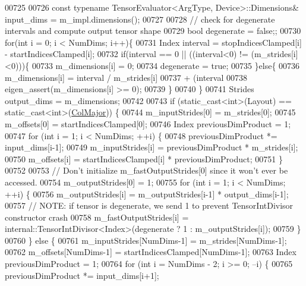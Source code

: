 \begin{DoxyCode}
00725 
00726     \textcolor{keyword}{const} \textcolor{keyword}{typename} TensorEvaluator<ArgType, Device>::Dimensions& input\_dims = m\_impl.dimensions();
00727 
00728     \textcolor{comment}{// check for degenerate intervals and compute output tensor shape}
00729     \textcolor{keywordtype}{bool} degenerate = \textcolor{keyword}{false};;
00730     \textcolor{keywordflow}{for}(\textcolor{keywordtype}{int} i = 0; i < NumDims; i++)\{
00731       Index interval = stopIndicesClamped[i] - startIndicesClamped[i];
00732       \textcolor{keywordflow}{if}(interval == 0 || ((interval<0) != (m\_strides[i]<0)))\{
00733         m\_dimensions[i] = 0;
00734         degenerate = \textcolor{keyword}{true};
00735       \}\textcolor{keywordflow}{else}\{
00736         m\_dimensions[i] = interval / m\_strides[i]
00737                           + (interval %
00738         eigen\_assert(m\_dimensions[i] >= 0);
00739       \}
00740     \}
00741     Strides output\_dims = m\_dimensions;
00742 
00743     \textcolor{keywordflow}{if} (static\_cast<int>(Layout) == static\_cast<int>(\hyperlink{group__enums_ggaacded1a18ae58b0f554751f6cdf9eb13a0cbd4bdd0abcfc0224c5fcb5e4f6669a}{ColMajor})) \{
00744       m\_inputStrides[0] = m\_strides[0];
00745       m\_offsets[0] = startIndicesClamped[0];
00746       Index previousDimProduct = 1;
00747       \textcolor{keywordflow}{for} (\textcolor{keywordtype}{int} i = 1; i < NumDims; ++i) \{
00748         previousDimProduct *= input\_dims[i-1];
00749         m\_inputStrides[i] = previousDimProduct * m\_strides[i];
00750         m\_offsets[i] = startIndicesClamped[i] * previousDimProduct;
00751       \}
00752 
00753       \textcolor{comment}{// Don't initialize m\_fastOutputStrides[0] since it won't ever be accessed.}
00754       m\_outputStrides[0] = 1;
00755       \textcolor{keywordflow}{for} (\textcolor{keywordtype}{int} i = 1; i < NumDims; ++i) \{
00756         m\_outputStrides[i] = m\_outputStrides[i-1] * output\_dims[i-1];
00757         \textcolor{comment}{// NOTE: if tensor is degenerate, we send 1 to prevent TensorIntDivisor constructor crash}
00758         m\_fastOutputStrides[i] = internal::TensorIntDivisor<Index>(degenerate ? 1 : m\_outputStrides[i]);
00759       \}
00760     \} \textcolor{keywordflow}{else} \{
00761       m\_inputStrides[NumDims-1] = m\_strides[NumDims-1];
00762       m\_offsets[NumDims-1] = startIndicesClamped[NumDims-1];
00763       Index previousDimProduct = 1;
00764       \textcolor{keywordflow}{for} (\textcolor{keywordtype}{int} i = NumDims - 2; i >= 0; --i) \{
00765         previousDimProduct *= input\_dims[i+1];

\end{DoxyCode}
